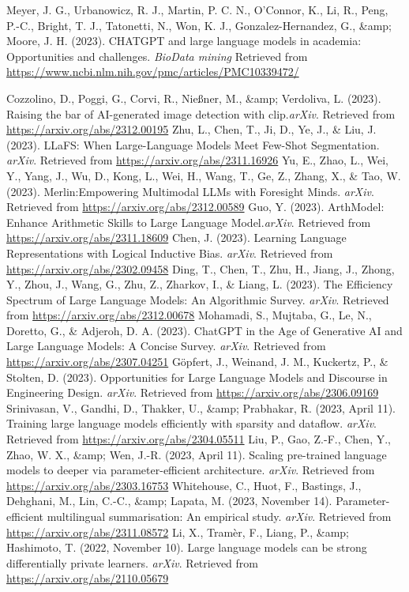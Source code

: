 \documentclass[]{article}
\begin{document}
\begin{thebibliography}{9}
Meyer, J. G., Urbanowicz, R. J., Martin, P. C. N., O’Connor, K., Li, R., Peng, P.-C., Bright, T. J., Tatonetti, N., Won, K. J., Gonzalez-Hernandez, G., \&amp; Moore, J. H. (2023). CHATGPT and large language models in academia: Opportunities and challenges. \textit{BioData mining} Retrieved from \url{https://www.ncbi.nlm.nih.gov/pmc/articles/PMC10339472/} 

Cozzolino, D., Poggi, G., Corvi, R., Nießner, M., \&amp; Verdoliva, L. (2023). Raising the bar of AI-generated image detection with clip.\textit{arXiv}. Retrieved from \url{https://arxiv.org/abs/2312.00195}
Zhu, L., Chen, T., Ji, D., Ye, J., \& Liu, J. (2023). LLaFS: When Large-Language Models Meet Few-Shot Segmentation. \textit{arXiv}. Retrieved from \url{https://arxiv.org/abs/2311.16926} 
Yu, E., Zhao, L., Wei, Y., Yang, J., Wu, D., Kong, L., Wei, H., Wang, T., Ge, Z., Zhang, X., \& Tao, W. (2023). Merlin:Empowering Multimodal LLMs with Foresight Minds. \textit{arXiv}. Retrieved from \url{https://arxiv.org/abs/2312.00589}
Guo, Y. (2023). ArthModel: Enhance Arithmetic Skills to Large Language Model.\textit{arXiv}. Retrieved from \url{https://arxiv.org/abs/2311.18609}
Chen, J. (2023). Learning Language Representations with Logical Inductive Bias. \textit{arXiv}. Retrieved from \url{https://arxiv.org/abs/2302.09458}
Ding, T., Chen, T., Zhu, H., Jiang, J., Zhong, Y., Zhou, J., Wang, G., Zhu, Z., Zharkov, I., \& Liang, L. (2023). The Efficiency Spectrum of Large Language Models: An Algorithmic Survey. \textit{arXiv}. Retrieved from \url{https://arxiv.org/abs/2312.00678}
Mohamadi, S., Mujtaba, G., Le, N., Doretto, G., \& Adjeroh, D. A. (2023). ChatGPT in the Age of Generative AI and Large Language Models: A Concise Survey. \textit{arXiv}. Retrieved from \url{https://arxiv.org/abs/2307.04251}
Göpfert, J., Weinand, J. M., Kuckertz, P., \& Stolten, D. (2023). Opportunities for Large Language Models and Discourse in Engineering Design. \textit{arXiv}. Retrieved from \url{https://arxiv.org/abs/2306.09169}
Srinivasan, V., Gandhi, D., Thakker, U., \&amp; Prabhakar, R. (2023, April 11). Training large language models efficiently with sparsity and dataflow.  \textit{arXiv}. Retrieved from \url{https://arxiv.org/abs/2304.05511}     
Liu, P., Gao, Z.-F., Chen, Y., Zhao, W. X., \&amp; Wen, J.-R. (2023, April 11). Scaling pre-trained language models to deeper via parameter-efficient architecture. \textit{arXiv}. Retrieved from \url{https://arxiv.org/abs/2303.16753} 
 Whitehouse, C., Huot, F., Bastings, J., Dehghani, M., Lin, C.-C., \&amp; Lapata, M. (2023, November 14). Parameter-efficient multilingual summarisation: An empirical study. \textit{arXiv}. Retrieved from \url{https://arxiv.org/abs/2311.08572} 
Li, X., Tramèr, F., Liang, P., \&amp; Hashimoto, T. (2022, November 10). Large language models can be strong differentially private learners. \textit{arXiv}. Retrieved from \url{https://arxiv.org/abs/2110.05679} 

\end{thebibliography}
\end{document}
